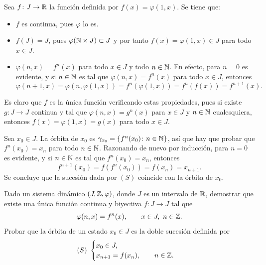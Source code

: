 \documentclass[11pt]{report}
\begin{document}
\begin{solution}
    Sea $f \colon J \to \mathbb R$ la función definida por $f(x) = \varphi(1,x)$. Se tiene que:
    \begin{itemize}
        \item $f$ es continua, pues $\varphi$ lo es.
        \item $f(J) = J$, pues $\varphi(\mathbb N \times J) \subset J$ y por tanto $f(x) = \varphi(1,x) \in J$ para todo $x \in J$.
        \item $\varphi(n,x) = f^n(x)$ para todo $x \in J$ y todo $n \in \mathbb N$. En efecto, para $n = 0$ es evidente, y si $n \in \mathbb N$ es tal que $\varphi(n,x) = f^n(x)$ para todo $x \in J$, entonces
        \[\varphi(n+1,x) = \varphi(n,\varphi(1,x)) = f^n(\varphi(1,x)) = f^n(f(x)) = f^{n+1}(x).\]
    \end{itemize}

    Es claro que $f$ es la única función verificando estas propiedades, pues si existe $g \colon J \to J$ continua y tal que $\varphi(n,x) = g^n(x)$ para $x \in J$ y $n \in \mathbb N$ cualesquiera, entonces $f(x) = \varphi(1,x) = g(x)$ para todo $x \in J$.

    Sea $x_0 \in J$. La órbita de $x_0$ es $\gamma_{x_0} = \{f^n(x_0) \colon n \in \mathbb N\}$, así que hay que probar que $f^n(x_0) = x_n$ para todo $n \in \mathbb N$. Razonando de nuevo por inducción, para $n = 0$ es evidente, y si $n \in \mathbb N$ es tal que $f^n(x_0) = x_n$, entonces
    \[f^{n+1}(x_0) = f(f^n(x_0)) = f(x_n) = x_{n+1}.\]
    Se concluye que la sucesión dada por $(S)$ coincide con la órbita de $x_0$.
\end{solution}

\begin{exercise}
    Dado un sistema dinámico $(J,\mathbb Z,\varphi)$, donde $J$ es un intervalo de $\mathbb R$, demostrar que existe una única función continua y biyectiva $f \colon J \to J$ tal que
    \[\varphi(n,x) = f^n(x), \qquad x \in J, \ n \in \mathbb Z.\]
    Probar que la órbita de un estado $x_0\in J$ es la doble sucesión definida por
    \[(S) \ \begin{cases}
        x_0 \in J, \\
        x_{n+1} = f(x_n), \qquad n \in \Z.
    \end{cases}\]
\end{exercise}
\end{document}
